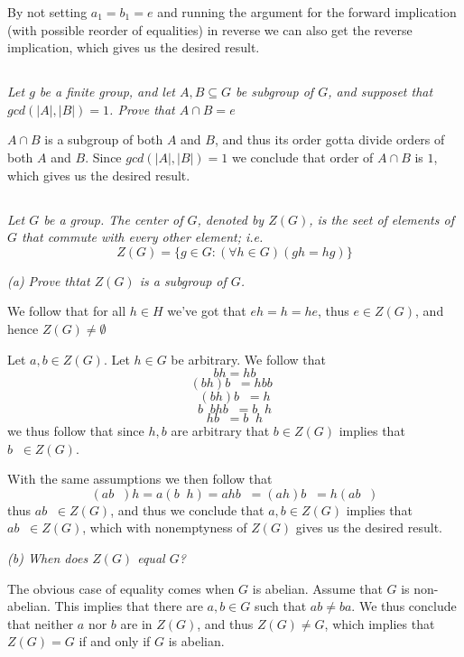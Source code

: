 \documentclass[11pt,oneside,titlepage]{book}
\DeclareMathOperator \inv {^{-1}}
\newcommand{\set}[1]{\{ #1 \}}
\begin{document}
By not setting $a_1 = b_1 = e$ and running the argument for the
forward implication (with possible reorder of equalities) in reverse
we can also get the reverse implication, which gives us the desired
result.

\subsection{}

\textit{Let $g$ be a finite group, and let $A, B \subseteq G$ be
subgroup of $G$, and supposet that $gcd(|A|, |B|) = 1$. Prove that $A
\cap B = e$}

$A \cap B$ is a subgroup of both $A$ and $B$, and thus its order gotta
divide orders of both $A$ and $B$. Since $gcd(|A|, |B|) = 1$ we
conclude that order of $A \cap B$ is $1$, which gives us the desired
result.

\subsection{}

\textit{Let $G$ be a group. The center of $G$, denoted by $Z(G)$, is
the seet of elements of $G$ that commute with every other element;
i.e.
$$Z(G) = \set{g \in G: (\forall h \in G)(gh = hg) }$$}

\textit{(a) Prove thtat $Z(G)$ is a subgroup of $G$.}

We follow that for all $h \in H$ we've got that $eh = h = he$, thus $e
\in Z(G)$, and hence $Z(G) \neq \emptyset$

Let $a, b \in Z(G)$. Let $h \in G$ be arbitrary. We follow that
$$bh = hb$$
$$(bh)b\inv = h b b\inv$$
$$(bh)b\inv = h$$
$$b\inv b h b\inv = b\inv h$$
$$h b\inv = b\inv h$$
we thus follow that since $h, b$ are arbitrary that $b \in Z(G)$
implies that $b\inv \in Z(G)$.

With the same assumptions we then follow that
$$(a b\inv) h = a (b\inv h) = a h b\inv = (a h) b\inv = h (a b\inv)$$
thus $a b\inv \in Z(G)$, and thus we conclude that $a, b \in Z(G)$
implies that $ab\inv \in Z(G)$, which with nonemptyness of $Z(G)$
gives us the desired result.

\textit{(b) When does $Z(G)$ equal $G$?}

The obvious case of equality comes when $G$ is abelian. Assume that
$G$ is non-abelian. This implies that there are $a, b \in G$ such that
$ab \neq b a $. We thus conclude that neither $a$ nor $b$ are in
$Z(G)$, and thus $Z(G) \neq G$, which implies that $Z(G) = G$ if and
only if $G$ is abelian.
\end{document}
